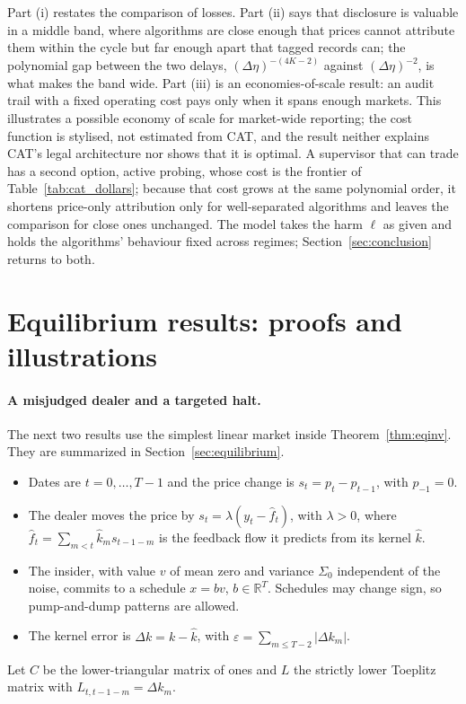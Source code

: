 \documentclass[12pt]{article}
\theoremstyle{definition}
\theoremstyle{remark}
\newcommand{\R}{\mathbb{R}}
\begin{document}
Part (i) restates the comparison of losses. Part (ii) says that disclosure is valuable in a middle band, where algorithms are close enough that prices cannot attribute them within the cycle but far enough apart that tagged records can; the polynomial gap between the two delays, $(\Delta\eta)^{-(4K-2)}$ against $(\Delta\eta)^{-2}$, is what makes the band wide. Part (iii) is an economies-of-scale result: an audit trail with a fixed operating cost pays only when it spans enough markets. This illustrates a possible economy of scale for market-wide reporting; the cost function is stylised, not estimated from CAT, and the result neither explains CAT's legal architecture nor shows that it is optimal. A supervisor that can trade has a second option, active probing, whose cost is the frontier of Table~\ref{tab:cat_dollars}; because that cost grows at the same polynomial order, it shortens price-only attribution only for well-separated algorithms and leaves the comparison for close ones unchanged. The model takes the harm $\ell$ as given and holds the algorithms' behaviour fixed across regimes; Section~\ref{sec:conclusion} returns to both.

\section{Equilibrium results: proofs and illustrations}\label{app:eqinv}

\paragraph{A misjudged dealer and a targeted halt.} The next two results use the simplest linear market inside Theorem~\ref{thm:eqinv}. They are summarized in Section~\ref{sec:equilibrium}.
\begin{itemize}[itemsep=1pt,topsep=2pt]
\item Dates are $t=0,\ldots,T-1$ and the price change is $s_t=p_t-p_{t-1}$, with $p_{-1}=0$.
\item The dealer moves the price by $s_t=\lambda(y_t-\hat f_t)$, with $\lambda>0$, where $\hat f_t=\sum_{m<t}\hat k_ms_{t-1-m}$ is the feedback flow it predicts from its kernel $\hat k$.
\item The insider, with value $v$ of mean zero and variance $\Sigma_0$ independent of the noise, commits to a schedule $x=bv$, $b\in\R^T$. Schedules may change sign, so pump-and-dump patterns are allowed.
\item The kernel error is $\Delta k=k-\hat k$, with $\varepsilon=\sum_{m\le T-2}|\Delta k_m|$.
\end{itemize}
Let $C$ be the lower-triangular matrix of ones and $L$ the strictly lower Toeplitz matrix with $L_{t,t-1-m}=\Delta k_m$.
\end{document}
